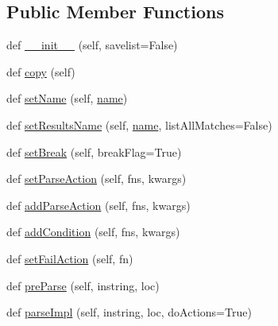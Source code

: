 \subsection*{Public Member Functions}
\begin{DoxyCompactItemize}
\item 
def \hyperlink{classpkg__resources_1_1__vendor_1_1pyparsing_1_1ParserElement_a21add207f1cb5e90c1732ac27449c1e7}{\+\_\+\+\_\+init\+\_\+\+\_\+} (self, savelist=False)
\item 
def \hyperlink{classpkg__resources_1_1__vendor_1_1pyparsing_1_1ParserElement_a4bd956ef315744a6fda3bfa660121750}{copy} (self)
\item 
def \hyperlink{classpkg__resources_1_1__vendor_1_1pyparsing_1_1ParserElement_a65024e7147c8b3d4fd3d0d161429737f}{set\+Name} (self, \hyperlink{classpkg__resources_1_1__vendor_1_1pyparsing_1_1ParserElement_a5c6a6316d9f079f59fd7e589559de911}{name})
\item 
def \hyperlink{classpkg__resources_1_1__vendor_1_1pyparsing_1_1ParserElement_a787aafab87357373be31819f83517344}{set\+Results\+Name} (self, \hyperlink{classpkg__resources_1_1__vendor_1_1pyparsing_1_1ParserElement_a5c6a6316d9f079f59fd7e589559de911}{name}, list\+All\+Matches=False)
\item 
def \hyperlink{classpkg__resources_1_1__vendor_1_1pyparsing_1_1ParserElement_a28cc2d9e28a3a71517249b2e9e5df9d5}{set\+Break} (self, break\+Flag=True)
\item 
def \hyperlink{classpkg__resources_1_1__vendor_1_1pyparsing_1_1ParserElement_a4fc9391373f5434729bec5a5440a2788}{set\+Parse\+Action} (self, fns, kwargs)
\item 
def \hyperlink{classpkg__resources_1_1__vendor_1_1pyparsing_1_1ParserElement_a21d9aab48590eca6709948628a4df8cd}{add\+Parse\+Action} (self, fns, kwargs)
\item 
def \hyperlink{classpkg__resources_1_1__vendor_1_1pyparsing_1_1ParserElement_aa60387fa923bdb94d8eb4f0e69261963}{add\+Condition} (self, fns, kwargs)
\item 
def \hyperlink{classpkg__resources_1_1__vendor_1_1pyparsing_1_1ParserElement_a542346bef86eb4801a0cc81f709ee2c0}{set\+Fail\+Action} (self, fn)
\item 
def \hyperlink{classpkg__resources_1_1__vendor_1_1pyparsing_1_1ParserElement_a15edef53df0616117f456d035181f3b1}{pre\+Parse} (self, instring, loc)
\item 
def \hyperlink{classpkg__resources_1_1__vendor_1_1pyparsing_1_1ParserElement_a8c5c41d249afece0b9418dbfefcf654b}{parse\+Impl} (self, instring, loc, do\+Actions=True)

\end{DoxyCompactItemize}
